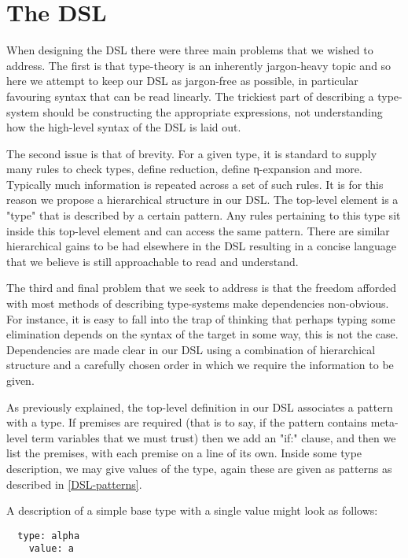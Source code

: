 \section{The DSL}
\label{DSL}

When designing the DSL there were three main problems that we wished to
address. The first is that
type-theory is an inherently jargon-heavy topic and so here we attempt
to keep our DSL as jargon-free as possible, in particular favouring
syntax that can be read linearly. The trickiest part of describing a
type-system should be constructing the appropriate expressions,
not understanding how the high-level syntax of the DSL is laid out.

The second issue is that of brevity. For a given type, it is standard
to supply many rules to check types, define reduction,
define η-expansion and more. Typically much information is
repeated across a set of such rules. It is for this reason we propose
a hierarchical structure in our DSL. The top-level element is a "type"
that is described by a certain pattern. Any rules pertaining to this
type sit inside this top-level element and can access the same
pattern. There are similar hierarchical gains to be had elsewhere in
the DSL resulting in a concise language that we believe is still
approachable to read and understand.

The third and final problem that we seek to address is that the
freedom afforded with most methods of describing type-systems make
dependencies non-obvious. For instance, it is easy to fall into the
trap of thinking that perhaps typing some elimination depends on the
syntax of the target in some way, this is not the case. Dependencies
are made clear in our DSL using a combination of hierarchical
structure and a carefully chosen order in which we require the
information to be given.

As previously explained, the top-level definition in our DSL
associates a pattern with a type. If premises are required (that is
to say, if the pattern contains meta-level term variables that we must
trust) then we add an "if:" clause, and then we list the premises,
with each premise on a line of its own. Inside some type description,
we may give values of the type, again these are given as patterns as
described in \ref{DSL-patterns}.

A description of a simple base type with a single value might look as
follows:

\begin{BVerbatim}
  type: alpha
    value: a
\end{BVerbatim}


